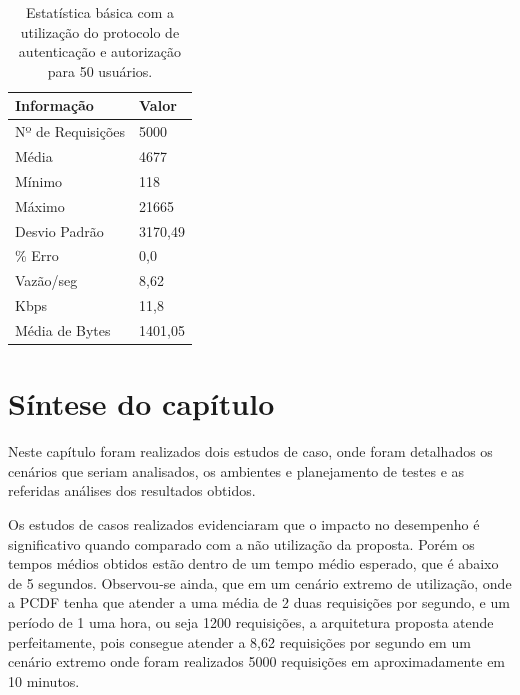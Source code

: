 \begin{table}[h]
\centering
\begin{tabular}{|l|l|}
\hline
\textbf{Informação} & \textbf{Valor} \\ \hline
Nº de Requisições   &  5000              \\ \hline
Média               &  4677             \\ \hline
Mínimo              &  118          \\ \hline
Máximo              &  21665        \\ \hline
Desvio Padrão       &  3170,49      \\ \hline
\% Erro             &  0,0          \\ \hline
Vazão/seg           &  8,62     \\ \hline
Kbps                &  11,8         \\ \hline
Média de Bytes      &  1401,05      \\ \hline
\end{tabular}
\caption {Estatística básica com a utilização do protocolo de autenticação e autorização para 50 usuários.}\label{tb:estatistica_com_cripto_50}
\end{table}

\section{Síntese do capítulo}
Neste capítulo foram realizados dois estudos de caso, onde foram detalhados os cenários que seriam analisados, os ambientes e planejamento de testes e as referidas análises dos resultados obtidos.

Os estudos de casos realizados evidenciaram que o impacto no desempenho é significativo quando comparado com a não utilização da proposta. Porém os tempos médios obtidos estão dentro de um tempo médio esperado, que é abaixo de 5 segundos. Observou-se ainda, que em um cenário extremo de utilização, onde a PCDF tenha que atender a uma média de 2 duas requisições por segundo, e um período de 1 uma hora, ou seja 1200 requisições, a arquitetura proposta atende perfeitamente, pois consegue atender a 8,62 requisições por segundo em um cenário extremo onde foram realizados 5000 requisições em aproximadamente em 10 minutos. 